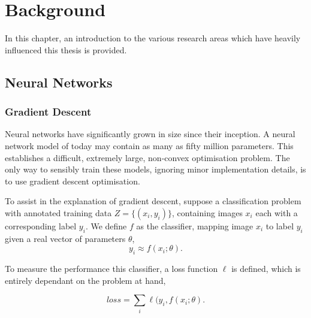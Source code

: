 \chapter{Background}

In this chapter, an introduction to the various research areas which
have heavily influenced this thesis is provided.





\section{Neural Networks}


\subsection{Gradient Descent}

Neural networks have significantly grown in size since their
inception. A neural network model of today may contain as many as
fifty million parameters. This establishes a difficult, extremely
large, non-convex optimisation problem. The only way to sensibly train
these models, ignoring minor implementation details, is to use
gradient descent optimisation.


To assist in the explanation of gradient descent, suppose a
classification problem with annotated training data
$Z = \{(x_i, y_i)\}$, containing images $x_i$ each with a
corresponding label $y_i$. We define $f$ as the classifier, mapping
image $x_i$ to label $y_i$ given a real vector of parameters $\theta$,
\begin{equation}
  y_i \approx f(x_i;\theta) .
\end{equation}

\noindent To measure the performance this classifier, a loss function
$\ell$ is defined, which is entirely dependant on the problem at hand,

\begin{equation}
  loss = \sum_i \ell(y_i, f(x_i ; \theta) .
\end{equation}


